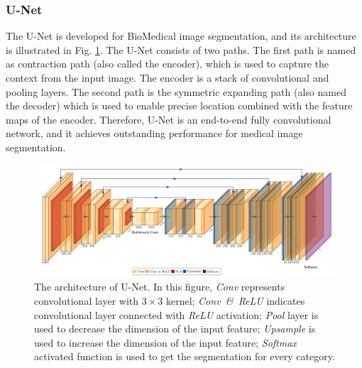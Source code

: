 \documentclass[journal]{IEEEtran}
\begin{document}

\subsubsection{U-Net}
The U-Net \cite{ronneberger2015u} is developed for BioMedical image segmentation, and its architecture is illustrated in Fig. \ref{fg:unet}. The U-Net consists of two paths. The first path is named as contraction path (also called the encoder), which is used to capture the context from the input image. The encoder is a stack of convolutional and pooling layers. The second path is the symmetric expanding path (also named the decoder) which is used to enable precise location combined with the feature maps of the encoder. Therefore, U-Net is an end-to-end fully convolutional network, and it achieves outstanding performance for medical image segmentation. 

\begin{figure}[t]
    \centering
    \includegraphics[width=1.8\columnwidth]{imgs/Unet.pdf}
    \caption{The architecture of U-Net. In this figure, \textit{Conv} represents convolutional layer with $3\times 3$ kernel; \textit{Conv~\&~ReLU} indicates convolutional layer connected with \textit{ReLU} activation; \textit{Pool} layer is used to decrease the dimension of the input feature; \textit{Upsample} is used to increase the dimension of the input feature; \textit{Softmax} activated function is used to get the segmentation for every category.  }
    \label{fg:unet}
\end{figure}
\end{document}
